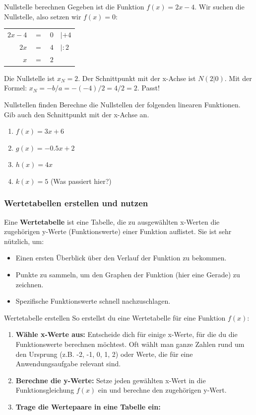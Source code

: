 \begin{beispielumgebung}{Nullstelle berechnen}
Gegeben ist die Funktion $f(x) = 2x - 4$.
Wir suchen die Nullstelle, also setzen wir $f(x)=0$:
\begin{center}
\begin{tabular}{r @{\,} c @{\,} l @{\quad\quad} l}
$2x - 4$ & $=$ & $0$ & $| +4$ \\
$2x$ & $=$ & $4$ & $| :2$ \\
$x$ & $=$ & $2$ & \\
\end{tabular}
\end{center}
Die Nullstelle ist $x_N=2$. Der Schnittpunkt mit der x-Achse ist $N(2|0)$.
Mit der Formel: $x_N = -b/a = -(-4)/2 = 4/2 = 2$. Passt!
\end{beispielumgebung}

\begin{aufgabenumgebung}{Nullstellen finden}
Berechne die Nullstellen der folgenden linearen Funktionen. Gib auch den Schnittpunkt mit der x-Achse an.
\begin{enumerate}
    \item $f(x) = 3x + 6$
    \item $g(x) = -0.5x + 2$
    \item $h(x) = 4x$
    \item $k(x) = 5$ (Was passiert hier?)
\end{enumerate}
\end{aufgabenumgebung}

\subsubsection{Wertetabellen erstellen und nutzen}
Eine \textbf{Wertetabelle} ist eine Tabelle, die zu ausgewählten x-Werten die zugehörigen y-Werte (Funktionswerte) einer Funktion auflistet. Sie ist sehr nützlich, um:
\begin{itemize}
    \item Einen ersten Überblick über den Verlauf der Funktion zu bekommen.
    \item Punkte zu sammeln, um den Graphen der Funktion (hier eine Gerade) zu zeichnen.
    \item Spezifische Funktionswerte schnell nachzuschlagen.
\end{itemize}

\begin{merksatzumgebung}{Wertetabelle erstellen}
So erstellst du eine Wertetabelle für eine Funktion $f(x)$:
\begin{enumerate}
    \item \textbf{Wähle x-Werte aus:} Entscheide dich für einige x-Werte, für die du die Funktionswerte berechnen möchtest. Oft wählt man ganze Zahlen rund um den Ursprung (z.B. -2, -1, 0, 1, 2) oder Werte, die für eine Anwendungsaufgabe relevant sind.
    \item \textbf{Berechne die y-Werte:} Setze jeden gewählten x-Wert in die Funktionsgleichung $f(x)$ ein und berechne den zugehörigen y-Wert.
    \item \textbf{Trage die Wertepaare in eine Tabelle ein:}
\end{enumerate}
\end{merksatzumgebung}

